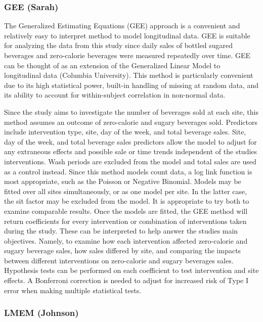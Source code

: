 \documentclass[
]{article}
\begin{document}
\hypertarget{gee-sarah}{%
\subsubsection{GEE (Sarah)}\label{gee-sarah}}

The Generalized Estimating Equations (GEE) approach is a convenient and
relatively easy to interpret method to model longitudinal data. GEE is
suitable for analyzing the data from this study since daily sales of
bottled sugared beverages and zero-calorie beverages were measured
repeatedly over time. GEE can be thought of as an extension of the
Generalized Linear Model to longitudinal data (Columbia University).
This method is particularly convenient due to its high statistical
power, built-in handling of missing at random data, and its ability to
account for within-subject correlation in non-normal data.

Since the study aims to investigate the number of beverages sold at each
site, this method assumes an outcome of zero-calorie and sugary
beverages sold. Predictors include intervention type, site, day of the
week, and total beverage sales. Site, day of the week, and total
beverage sales predictors allow the model to adjust for any extraneous
effects and possible sale or time trends independent of the studies
interventions. Wash periods are excluded from the model and total sales
are used as a control instead. Since this method models count data, a
log link function is most appropriate, such as the Poisson or Negative
Binomial. Models may be fitted over all sites simultaneously, or as one
model per site. In the latter case, the sit factor may be excluded from
the model. It is appropriate to try both to examine comparable results.
Once the models are fitted, the GEE method will return coefficients for
every intervention or combination of interventions taken during the
study. These can be interpreted to help answer the studies main
objectives. Namely, to examine how each intervention affected
zero-calorie and sugary beverage sales, how sales differed by site, and
comparing the impacts between different interventions on zero-calorie
and sugary beverages sales. Hypothesis tests can be performed on each
coefficient to test intervention and site effects. A Bonferroni
correction is needed to adjust for increased risk of Type I error when
making multiple statistical tests.

\hypertarget{lmem-johnson}{%
\subsubsection{LMEM (Johnson)}\label{lmem-johnson}}
\end{document}
